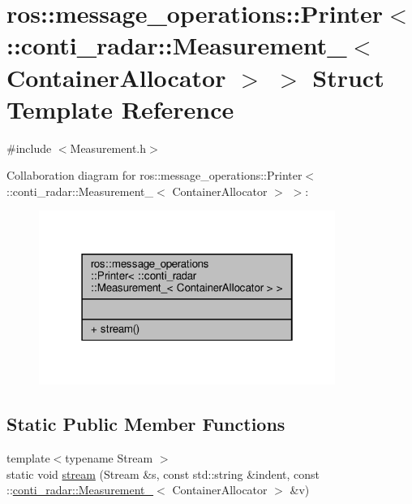 \hypertarget{structros_1_1message__operations_1_1Printer_3_01_1_1conti__radar_1_1Measurement___3_01ContainerAllocator_01_4_01_4}{}\section{ros\+:\+:message\+\_\+operations\+:\+:Printer$<$ \+:\+:conti\+\_\+radar\+:\+:Measurement\+\_\+$<$ Container\+Allocator $>$ $>$ Struct Template Reference}
\label{structros_1_1message__operations_1_1Printer_3_01_1_1conti__radar_1_1Measurement___3_01ContainerAllocator_01_4_01_4}


{\ttfamily \#include $<$Measurement.\+h$>$}



Collaboration diagram for ros\+:\+:message\+\_\+operations\+:\+:Printer$<$ \+:\+:conti\+\_\+radar\+:\+:Measurement\+\_\+$<$ Container\+Allocator $>$ $>$\+:\nopagebreak
\begin{figure}[H]
\begin{center}
\leavevmode
\includegraphics[width=274pt]{db/d58/structros_1_1message__operations_1_1Printer_3_01_1_1conti__radar_1_1Measurement___3_01ContainerAllocator_01_4_01_4__coll__graph}
\end{center}
\end{figure}
\subsection*{Static Public Member Functions}
\begin{DoxyCompactItemize}
\item 
{\footnotesize template$<$typename Stream $>$ }\\static void \hyperlink{structros_1_1message__operations_1_1Printer_3_01_1_1conti__radar_1_1Measurement___3_01ContainerAllocator_01_4_01_4_ab4aa2261b5a296f3e37c3449218c8dde}{stream} (Stream \&s, const std\+::string \&indent, const \+::\hyperlink{structconti__radar_1_1Measurement__}{conti\+\_\+radar\+::\+Measurement\+\_\+}$<$ Container\+Allocator $>$ \&v)
\end{DoxyCompactItemize}


